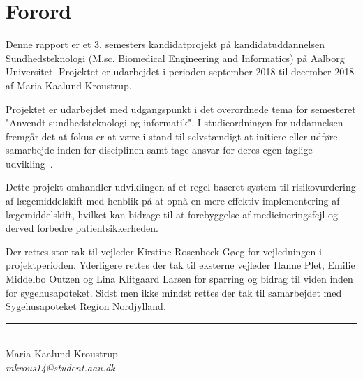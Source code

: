 \chapter*{Forord}
Denne rapport er et 3. semesters kandidatprojekt på kandidatuddannelsen Sundhedsteknologi (M.sc. Biomedical Engineering and Informatics) på Aalborg Universitet. Projektet er udarbejdet i perioden september 2018 til december 2018 af Maria Kaalund Kroustrup. 

Projektet er udarbejdet med udgangspunkt i det overordnede tema for semesteret "Anvendt sundhedsteknologi og informatik". I studieordningen for uddannelsen fremgår det at fokus er at være i stand til selvstændigt at initiere eller udføre samarbejde inden for disciplinen samt tage ansvar for deres egen faglige udvikling~\citep{Studieordning2011}. 

Dette projekt omhandler udviklingen af et regel-baseret system til risikovurdering af lægemiddelskift med henblik på at opnå en mere effektiv implementering af lægemiddelskift, hvilket kan bidrage til at forebyggelse af medicineringsfejl og derved forbedre patientsikkerheden. 

Der rettes stor tak til vejleder Kirstine Rosenbeck Gøeg for vejledningen i projektperioden. Yderligere rettes der tak til eksterne vejleder Hanne Plet, Emilie Middelbo Outzen og Lina Klitgaard Larsen for sparring og bidrag til viden inden for sygehusapoteket. Sidst men ikke mindst rettes der tak til samarbejdet med Sygehusapoteket Region Nordjylland. 

\vspace{1.5cm}
\begin{center}
\rule{6cm}{0.4pt} \\
Maria Kaalund Kroustrup \\
\textit{mkrous14@student.aau.dk}
\end{center}